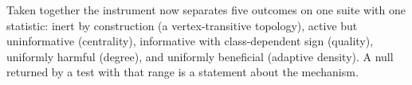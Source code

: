 Taken together the instrument now separates five outcomes on one suite with
one statistic: inert by construction (a vertex-transitive topology),
active but uninformative (centrality), informative with class-dependent sign
(quality), uniformly harmful (degree), and uniformly beneficial (adaptive
density). A null returned by a test with that range is a statement about the
mechanism.

